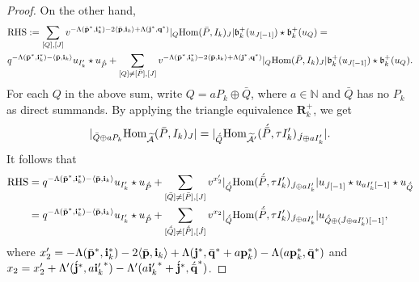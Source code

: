 \documentclass[reqno,12pt]{amsart}
\numberwithin{equation}{section}
\theoremstyle{plain} %
\theoremstyle{definition} %
\begin{document}
\begin{proof}
On the other hand,
\begin{align*}
&{\rm RHS}:=\sum_{[Q],[J]}v^{-\Lambda(\bar{\bf p }^\ast,{\bf i}_k^\ast)-2\langle \bar{\bf p},{\bf i}_k\rangle+\Lambda({\bf j}^\ast,{\bf q}^\ast)}|_Q\mbox{\rm Hom}(\bar{P},I_k)_J|\mathfrak{b}_k^+(u_{J[-1]})\star \mathfrak{b}_k^+(u_Q)=\\
	 	&q^{-\Lambda(\bar{\bf p }^\ast,{\bf i}_k^\ast)-\langle \bar{\bf p},{\bf i}_k\rangle}u_{I_k'}\star u_{\acute{\bar{P}}}+\sum_{[Q]\neq [\bar{P}],[J]}v^{-\Lambda(\bar{\bf p }^\ast,{\bf i}_k^\ast)-2\langle \bar{\bf p},{\bf i}_k\rangle+\Lambda({\bf j}^\ast,{\bf q}^\ast)}|_Q\mbox{\rm Hom}(\bar{P},I_k)_J|\mathfrak{b}_k^+(u_{J[-1]})\star \mathfrak{b}_k^+(u_Q).
	 \end{align*}
For each $Q$ in the above sum, write $Q=aP_k\oplus \bar{Q}$, where $a\in\mathbb{N}$ and $\bar{Q}$ has no $P_k$ as direct summands. By applying the triangle equivalence $\mathbf{R}_k^+$, we get
\[|_{\bar{Q}\oplus aP_k}\mbox{\rm Hom}_{\widetilde{\mathcal{A}}}(\bar{P},I_k)_J|=|_{\acute{{\bar{Q}}}}\mbox{\rm Hom}_{\widetilde{\mathcal{A}'}}({\acute{\bar{P}}},\tau I_k')_{\acute{J}\oplus aI_k'}|.\]
It follows that
\begin{align*}
{\rm RHS}&=q^{-\Lambda(\bar{\bf p }^\ast,{\bf i}_k^\ast)-\langle \bar{\bf p},{\bf i}_k\rangle}u_{I_k'}\star u_{\acute{\bar{P}}}
+\sum_{[\bar{Q}]\neq [\bar{P}],[J]}v^{x'_2}|_{\acute{{\bar{Q}}}}\mbox{\rm Hom}({\acute{\bar{P}}},\tau I_k')_{\acute{J}\oplus aI_k'}|u_{\acute{J}[-1]}\star u_{aI_k'[-1]}\star u_{\acute{\bar{Q}}}\\
	 	&=q^{-\Lambda(\bar{\bf p }^\ast,{\bf i}_k^\ast)-\langle \bar{\bf p},{\bf i}_k\rangle}u_{I_k'}\star u_{\acute{\bar{P}}}+\sum_{{[{\acute{\bar{Q}}}]\neq [{\acute{\bar{P}}}],[\acute{J}]}}v^{x_2}
	 	|_{\acute{{\bar{Q}}}}\mbox{\rm Hom}({\acute{\bar{P}}},\tau I_k')_{\acute{J}\oplus aI_k'}| u_{{\acute{\bar{Q}}}\oplus({\acute{J}}\oplus aI_k')[-1]},
	 \end{align*}
where $x'_2=-\Lambda(\bar{\bf p }^\ast,{\bf i}_k^\ast)-2\langle \bar{\bf p},{\bf i}_k\rangle+\Lambda({\bf j}^\ast,\bar{\bf q}^\ast+a{\bf p}_k^\ast)-\Lambda(a{\bf p}_k^\ast,\bar{\bf q}^\ast)$ and $x_2=x'_2+\Lambda'({\acute{{\bf j}}}^\ast,a{{\bf i}_k'}^\ast)-\Lambda'(a{{\bf i}_k'}^\ast+{\acute{{\bf j}}}^\ast, {\acute{\bar{\bf q}}}^\ast)$.


\end{proof}
\end{document}
